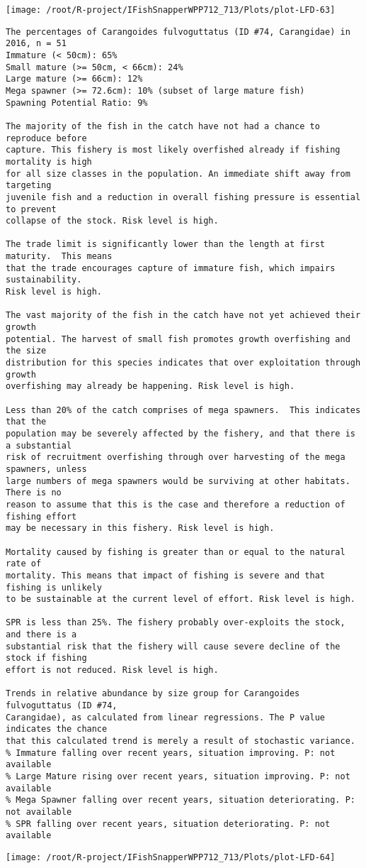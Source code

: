 \documentclass{report}\usepackage[]{graphicx}\usepackage[]{color}
\makeatletter
\def\maxwidth{ %
  \ifdim\Gin@nat@width>\linewidth
    \linewidth
  \else
    \Gin@nat@width
  \fi
}
\newenvironment{kframe}{%
 \def\at@end@of@kframe{}%
 \ifinner\ifhmode%
  \def\at@end@of@kframe{\end{minipage}}%
  \begin{minipage}{\columnwidth}%
 \fi\fi%
 \def\FrameCommand##1{\hskip\@totalleftmargin \hskip-\fboxsep
 \colorbox{shadecolor}{##1}\hskip-\fboxsep
     \hskip-\linewidth \hskip-\@totalleftmargin \hskip\columnwidth}%
 \MakeFramed {\advance\hsize-\width
   \@totalleftmargin\z@ \linewidth\hsize
   \@setminipage}}%
 {\par\unskip\endMakeFramed%
 \at@end@of@kframe}
\newenvironment{knitrout}{}{} %
\makeatother
\begin{document}
\begin{knitrout}
\texttt{[image: /root/R-project/IFishSnapperWPP712\_713/Plots/plot-LFD-63]} 
\begin{kframe}\begin{verbatim}
The percentages of Carangoides fulvoguttatus (ID #74, Carangidae) in 2016, n = 51
Immature (< 50cm): 65%
Small mature (>= 50cm, < 66cm): 24%
Large mature (>= 66cm): 12%
Mega spawner (>= 72.6cm): 10% (subset of large mature fish)
Spawning Potential Ratio: 9%
 
The majority of the fish in the catch have not had a chance to reproduce before
capture. This fishery is most likely overfished already if fishing mortality is high
for all size classes in the population. An immediate shift away from targeting
juvenile fish and a reduction in overall fishing pressure is essential to prevent
collapse of the stock. Risk level is high.

The trade limit is significantly lower than the length at first maturity.  This means
that the trade encourages capture of immature fish, which impairs sustainability.
Risk level is high.

The vast majority of the fish in the catch have not yet achieved their growth
potential. The harvest of small fish promotes growth overfishing and the size
distribution for this species indicates that over exploitation through growth
overfishing may already be happening. Risk level is high.

Less than 20% of the catch comprises of mega spawners.  This indicates that the
population may be severely affected by the fishery, and that there is a substantial
risk of recruitment overfishing through over harvesting of the mega spawners, unless
large numbers of mega spawners would be surviving at other habitats. There is no
reason to assume that this is the case and therefore a reduction of fishing effort
may be necessary in this fishery. Risk level is high.
 
Mortality caused by fishing is greater than or equal to the natural rate of
mortality. This means that impact of fishing is severe and that fishing is unlikely
to be sustainable at the current level of effort. Risk level is high.
 
SPR is less than 25%. The fishery probably over-exploits the stock, and there is a
substantial risk that the fishery will cause severe decline of the stock if fishing
effort is not reduced. Risk level is high.
 
Trends in relative abundance by size group for Carangoides fulvoguttatus (ID #74,
Carangidae), as calculated from linear regressions. The P value indicates the chance
that this calculated trend is merely a result of stochastic variance.
% Immature falling over recent years, situation improving. P: not available
% Large Mature rising over recent years, situation improving. P: not available
% Mega Spawner falling over recent years, situation deteriorating. P: not available
% SPR falling over recent years, situation deteriorating. P: not available
\end{verbatim}
\end{kframe}
\texttt{[image: /root/R-project/IFishSnapperWPP712\_713/Plots/plot-LFD-64]} 


\end{knitrout}
\end{document}
